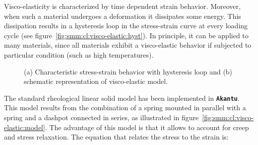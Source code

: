 \documentclass[a4paper,11pt]{book}
\newcommand{\akantu}{{\texttt{\textbf{Akantu}}}\xspace}
\begin{document}
Visco-elasticity is characterized by time dependent strain behavior. Moreover, when such a material undergoes a deformation it dissipates some energy. This dissipation results in a hysteresis loop in the stress-strain curve at every loading cycle (see figure~\ref{fig:smm:cl:visco-elastic:hyst}). In principle, it can be applied to many materials, since all materials exhibit a visco-elastic behavior if subjected to particular condition (such as high temperatures).
\begin{figure}[!htb]
  \begin{center}

    \hspace{0.05\textwidth}
    \caption{(a) Characteristic stress-strain behavior with hysteresis loop and (b) schematic representation of visco-elastic model.}
    \label{fig:smm:cl:visco-elastic}
  \end{center}
\end{figure}
The standard rheological linear solid model has been implemented in \akantu. This model results from the combination of a spring mounted in parallel with a spring and a dashpot connected in series, as illustrated in figure~\ref{fig:smm:cl:visco-elastic:model}. The advantage of this model is that it allows to account for creep and stress relaxation. The equation that relates the stress to the strain is:
\end{document}
